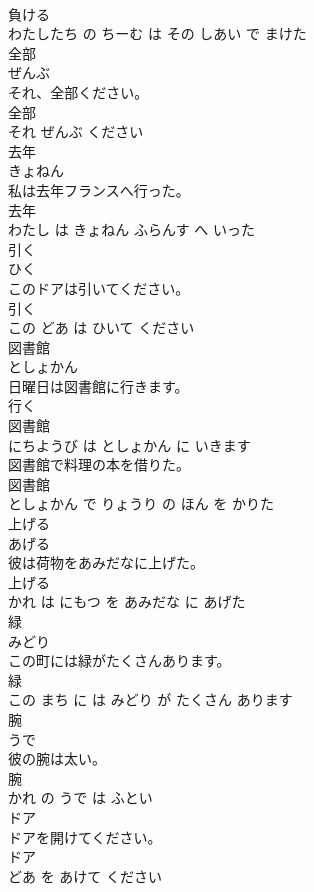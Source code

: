 \documentclass[8pt]{extreport}
\begin{document}
\begin{CJK}{UTF8}{min}
\\	負ける 
\\	わたしたち の ちーむ は その しあい で まけた			
\\	全部	
\\	ぜんぶ			
\\	それ、全部ください。	
\\	全部 
\\	それ ぜんぶ ください			
\\	去年	
\\	きょねん			
\\	私は去年フランスへ行った。	
\\	去年 
\\	わたし は きょねん ふらんす へ いった			
\\	引く	
\\	ひく			
\\	このドアは引いてください。	
\\	引く 
\\	この どあ は ひいて ください			
\\	図書館	
\\	としょかん			
\\	日曜日は図書館に行きます。	
\\	行く 
\\	図書館 
\\	にちようび は としょかん に いきます			
\\	図書館で料理の本を借りた。	
\\	図書館 
\\	としょかん で りょうり の ほん を かりた			
\\	上げる	
\\	あげる			
\\	彼は荷物をあみだなに上げた。	
\\	上げる 
\\	かれ は にもつ を あみだな に あげた			
\\	緑	
\\	みどり			
\\	この町には緑がたくさんあります。	
\\	緑 
\\	この まち に は みどり が たくさん あります			
\\	腕	
\\	うで			
\\	彼の腕は太い。	
\\	腕 
\\	かれ の うで は ふとい			
\\	ドア	
\\	ドアを開けてください。	
\\	ドア 
\\	どあ を あけて ください			
\end{CJK}
\end{document}
